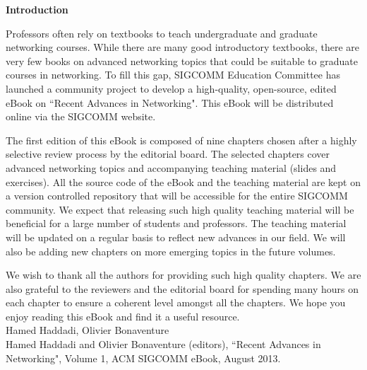 \pagestyle{empty}

{\Huge \textbf{Introduction}}

\vspace{1in}


Professors often rely on textbooks to teach undergraduate and graduate networking courses. While there are many good introductory textbooks, there are very few books on advanced networking topics that could be suitable to graduate courses in networking. To fill this gap, SIGCOMM Education Committee has launched a community project to develop a high-quality, open-source, edited eBook on ``Recent Advances in Networking". This eBook will be distributed online via the SIGCOMM website. 

The first edition of this eBook is composed of nine chapters chosen after a highly selective review process by the editorial board. The selected chapters cover advanced networking topics and accompanying teaching material (slides and exercises). All the source code of the eBook and the teaching material are kept on a version controlled repository that will be accessible for the entire SIGCOMM community. We expect that releasing such high quality teaching material will be beneficial for a large number of students and professors. The teaching material will be updated on a regular basis to reflect new advances in our field. We will also be adding new chapters on more emerging topics in the future volumes.


We wish to thank all the authors for providing such high quality chapters. We are also grateful to the reviewers and the editorial board for spending many hours on each chapter to ensure a coherent level amongst all the chapters. We hope you enjoy reading this eBook and find it a useful resource.\\


Hamed Haddadi, Olivier Bonaventure \\ 


\vspace{1in}
Hamed Haddadi and Olivier Bonaventure (editors), ``Recent Advances in Networking", Volume 1, ACM SIGCOMM eBook, August 2013. 

